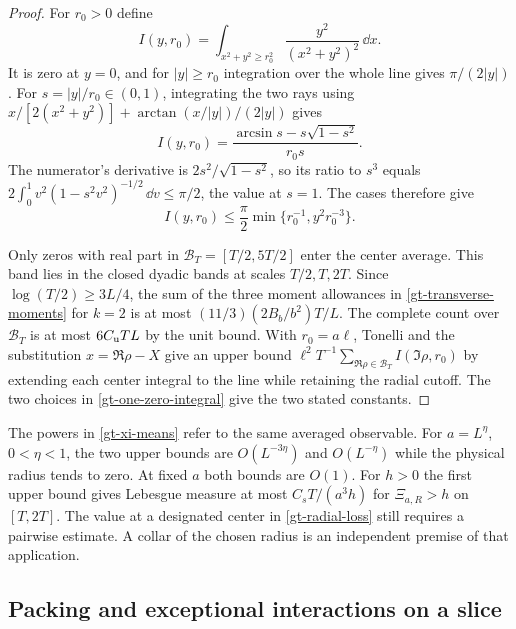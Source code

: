 \begin{proof}
For \(r_0>0\) define
\[
 I(y,r_0)=\int_{x^2+y^2\ge r_0^2}\frac{y^2}{(x^2+y^2)^2}\,\dd x .
\]
It is zero at \(y=0\), and for \(|y|\ge r_0\) integration over the
whole line gives \(\pi/(2|y|)\). For \(s=|y|/r_0\in(0,1)\),
integrating the two rays using
\(x/[2(x^2+y^2)]+\arctan(x/|y|)/(2|y|)\) gives
\[
 I(y,r_0)=\frac{\arcsin s-s\sqrt{1-s^2}}{r_0s}.
\]
The numerator's derivative is \(2s^2/\sqrt{1-s^2}\), so its ratio to
\(s^3\) equals \(2\int_0^1 v^2(1-s^2v^2)^{-1/2}\,\dd v\le\pi/2\),
the value at \(s=1\). The cases therefore give
\begin{equation}
 I(y,r_0)\le\frac\pi2\min\{r_0^{-1},y^2r_0^{-3}\}.
 \label{gt-one-zero-integral}
\end{equation}

Only zeros with real part in \(\mathcal B_T=[T/2,5T/2]\) enter the
center average. This band lies in the closed dyadic bands at scales
\(T/2,T,2T\). Since \(\log(T/2)\ge3L/4\), the sum of the three
moment allowances in \eqref{gt-transverse-moments} for \(k=2\) is
at most \((11/3)(2B_b/b^2)T/L\). The complete count over
\(\mathcal B_T\) is at most \(6C_{\rm u}TL\) by the unit bound.
With \(r_0=a\ell\), Tonelli and the substitution \(x=\Re\rho-X\)
give an upper bound \(\ell^2 T^{-1}\sum_{\Re\rho\in\mathcal B_T}
I(\Im\rho,r_0)\) by extending each center integral to the line
while retaining the radial cutoff. The two choices in
\eqref{gt-one-zero-integral} give the two stated constants.
\end{proof}

The powers in \eqref{gt-xi-means} refer to the same averaged observable.
For \(a=L^\eta\), \(0<\eta<1\), the two upper bounds are
\(O(L^{-3\eta})\) and \(O(L^{-\eta})\) while the physical radius
tends to zero. At fixed \(a\) both bounds are \(O(1)\).
For \(h>0\) the first upper bound gives Lebesgue measure
at most \(C_sT/(a^3h)\) for \(\Xi_{a,R}>h\) on \([T,2T]\).
The value at a designated center in \eqref{gt-radial-loss} still
requires a pairwise estimate. A collar of the chosen radius is an
independent premise of that application.

\subsection{Packing and exceptional interactions on a slice}

